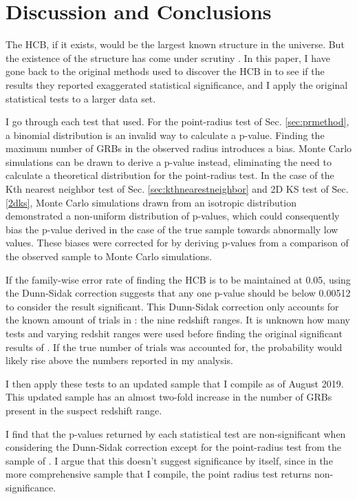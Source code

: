 \documentclass[fleqn,usenatbib]{mnras}
\begin{document}
\section{Discussion and Conclusions}
The HCB, if it exists, would be the largest known structure in the universe. But the existence of the structure has come under scrutiny \citep{ukwatta2016}. In this paper, I have gone back to the original methods used to discover the HCB in \citet{horvath2014} to see if the results they reported exaggerated statistical significance, and I apply the original statistical tests to a larger data set.

I go through each test that \citet{horvath2014} used. For the point-radius test of Sec. \ref{sec:prmethod}, a binomial distribution is an invalid way to calculate a p-value. Finding the maximum number of GRBs in the observed radius introduces a bias. Monte Carlo simulations can be drawn to derive a p-value instead, eliminating the need to calculate a theoretical distribution for the point-radius test. In the case of the Kth nearest neighbor test of Sec. \ref{sec:kthnearestneighbor} and 2D KS test of Sec. \ref{2dks}, Monte Carlo simulations drawn from an isotropic distribution demonstrated a non-uniform distribution of p-values, which could consequently bias the p-value derived in the case of the true sample towards abnormally low values. These biases were corrected for by deriving p-values from a comparison of the observed sample to Monte Carlo simulations.

If the family-wise error rate of finding the HCB is to be maintained at 0.05, using the Dunn-Sidak correction suggests that any one p-value should be below 0.00512 to consider the result significant. This Dunn-Sidak correction only accounts for the known amount of trials in \citet{horvath2014}: the nine redshift ranges. It is unknown how many tests and varying redshit ranges were used before finding the original significant results of \citet{horvath2014}. If the true number of trials was accounted for, the probability would likely rise above the numbers reported in my analysis.

I then apply these tests to an updated sample that I compile as of August 2019. This updated sample has an almost two-fold increase in the number of GRBs present in the suspect redshift range.

I find that the p-values returned by each statistical test are non-significant when considering the Dunn-Sidak correction except for the point-radius test from the sample of \citet{horvath2015}. I argue that this doesn't suggest significance by itself, since in the more comprehensive sample that I compile, the point radius test returns non-significance.
\end{document}
